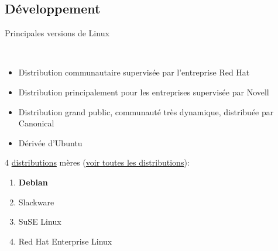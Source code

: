 \documentclass{beamer}
\begin{document}
\subsection*{D\'eveloppement}
\begin{frame}
  \begin{block}{ Principales versions de Linux}

    ~~~~~~~~~~~~~~~~%
    \begin{minipage}[t]{0.85\linewidth}
      \begin{itemize}
      \item[Fedora :] Distribution communautaire supervisée par l'entreprise Red Hat
      \item[openSUSE :] Distribution principalement pour les entreprises supervis\'ee par Novell
      \item[Ubuntu :] Distribution grand public, communaut\'e tr\`es dynamique, distribuée par Canonical
      \item[Linux Mint :] Dérivée d'Ubuntu
      \end{itemize}
    \end{minipage}

  \end{block}

\vspace{3mm}
4 \href{https://fr.wikipedia.org/wiki/Distribution_Linux}{distributions} mères (\href{https://fr.wikipedia.org/wiki/Distribution_Linux\#/media/File:Linux_Distribution_Timeline.svg}{voir toutes les distributions}):\\
\begin{enumerate}
\item \textbf{Debian}
\item Slackware
\item SuSE Linux
\item Red Hat Enterprise Linux
\end{enumerate}
\end{frame}
\end{document}
